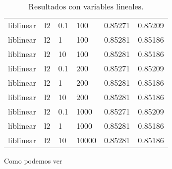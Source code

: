 \documentclass[11pt,a4paper]{article}
\begin{document}
\begin{table}[h]
\begin{center}
\begin{tabular}{|l|l|l|l|l|l|}
liblinear & l2 & 0.1 & 100 & 0.85271 & 0.85209\\

liblinear & l2 & 1 & 100 & 0.85281 & 0.85186\\

liblinear & l2 & 10  &100  & 0.85281 & 0.85186\\

liblinear & l2 & 0.1 & 200 & 0.85271 & 0.85209\\

liblinear & l2 & 1  &200  & 0.85281 & 0.85186\\

liblinear & l2 & 10 & 200 & 0.85281 & 0.85186\\

liblinear & l2 & 0.1 & 1000 & 0.85271 & 0.85209\\

liblinear & l2 & 1 & 1000 & 0.85281 & 0.85186\\

liblinear & l2 & 10  &10000 & 0.85281 & 0.85186\\\hline

\end{tabular}
\end{center}
\caption{Resultados con variables lineales.}
	\end{table}

Como podemos ver 



 \newpage
\end{document}
